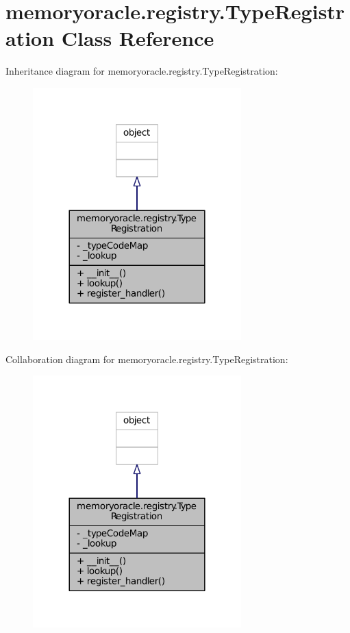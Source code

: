\hypertarget{classmemoryoracle_1_1registry_1_1TypeRegistration}{}\section{memoryoracle.\+registry.\+Type\+Registration Class Reference}
\label{classmemoryoracle_1_1registry_1_1TypeRegistration}


Inheritance diagram for memoryoracle.\+registry.\+Type\+Registration\+:
\nopagebreak
\begin{figure}[H]
\begin{center}
\leavevmode
\includegraphics[width=228pt]{classmemoryoracle_1_1registry_1_1TypeRegistration__inherit__graph}
\end{center}
\end{figure}


Collaboration diagram for memoryoracle.\+registry.\+Type\+Registration\+:
\nopagebreak
\begin{figure}[H]
\begin{center}
\leavevmode
\includegraphics[width=228pt]{classmemoryoracle_1_1registry_1_1TypeRegistration__coll__graph}
\end{center}
\end{figure}
